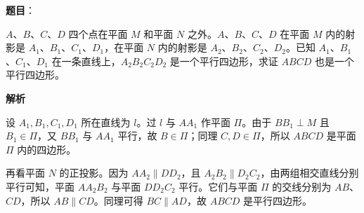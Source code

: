 \begin{answer}

\textbf{题目}：

$A$、$B$、$C$、$D$ 四个点在平面 $M$ 和平面 $N$ 之外。$A$、$B$、$C$、$D$ 在平面 $M$ 内的射影是 $A_1$、$B_1$、$C_1$、$D_1$，在平面 $N$ 内的射影是 $A_2$、$B_2$、$C_2$、$D_2$。已知 $A_1$、$B_1$、$C_1$、$D_1$ 在一条直线上，$A_2B_2C_2D_2$ 是一个平行四边形，求证 $ABCD$ 也是一个平行四边形。

\textbf{解析}

设 $A_1,B_1,C_1,D_1$ 所在直线为 $l$。过 $l$ 与 $AA_1$ 作平面 $\Pi$。由于 $BB_1\perp M$ 且 $B_1\in\Pi$，又 $BB_1$ 与 $AA_1$ 平行，故 $B\in\Pi$；同理 $C,D\in\Pi$，所以 $ABCD$ 是平面 $\Pi$ 内的四边形。

再看平面 $N$ 的正投影。因为 $AA_2\parallel DD_2$，且 $A_2B_2\parallel D_2C_2$，由两组相交直线分别平行可知，平面 $AA_2B_2$ 与平面 $DD_2C_2$ 平行。它们与平面 $\Pi$ 的交线分别为 $AB$、$CD$，所以 $AB\parallel CD$。同理可得 $BC\parallel AD$，故 $ABCD$ 是平行四边形。
\nopagebreak[4]
\begin{center}\end{center}
\nopagebreak[4]

\end{answer}
